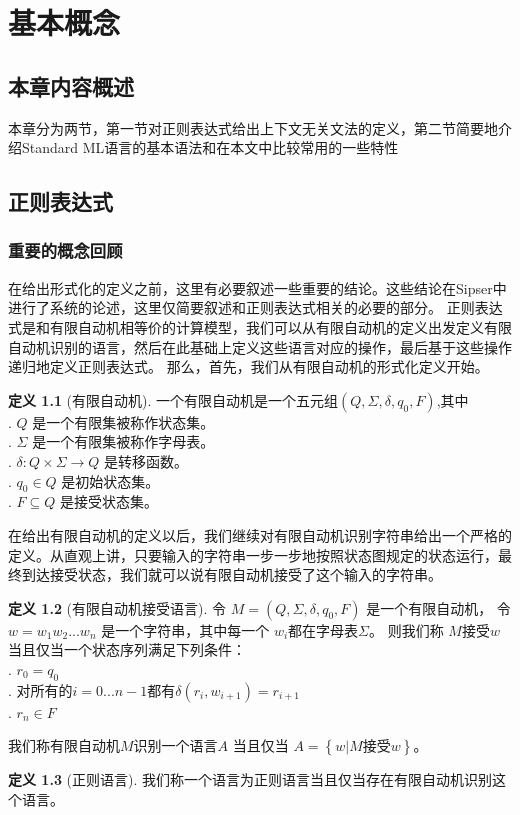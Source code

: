 \documentclass[openany,oneside]{book}
\theoremstyle{definition}
\newtheorem{definition}{\hspace{2em}定义}[chapter]
\begin{document}
\chapter{基本概念}
\section{本章内容概述}
	本章分为两节，第一节对正则表达式给出上下文无关文法的定义，第二节简要地介绍Standard ML语言的基本语法和在本文中比较常用的一些特性

\section{正则表达式}
\subsection{重要的概念回顾}
	在给出形式化的定义之前，这里有必要叙述一些重要的结论。这些结论在Sipser\cite{Sips05a}中进行了系统的论述，这里仅简要叙述和正则表达式相关的必要的部分。
	正则表达式是和有限自动机相等价的计算模型，我们可以从有限自动机的定义出发定义有限自动机识别的语言，然后在此基础上定义这些语言对应的操作，最后基于这些操作递归地定义正则表达式。
	那么，首先，我们从有限自动机的形式化定义开始。
	\begin{definition}[有限自动机]
		一个有限自动机是一个五元组\(\left( Q,\Sigma,\delta,q_0,F\right) \),其中\\
		\indent {}. \(Q\) 是一个有限集被称作状态集。\\
		\indent {}. \(\Sigma\) 是一个有限集被称作字母表。\\
		\indent {}. \(\delta : Q \times \Sigma \rightarrow Q\) 是转移函数。\\
		\indent {}. \(q_0 \in Q\) 是初始状态集。\\
		\indent {}. \(F \subseteq Q\) 是接受状态集。
	\end{definition}
	在给出有限自动机的定义以后，我们继续对有限自动机识别字符串给出一个严格的定义。从直观上讲，只要输入的字符串一步一步地按照状态图规定的状态运行，最终到达接受状态，我们就可以说有限自动机接受了这个输入的字符串。
	\begin{definition}[有限自动机接受语言]
		令 \(M = \left( Q,\Sigma,\delta,q_0,F\right)\) 是一个有限自动机， 令 \( w = w_1 w_2 ... w_n\) 是一个字符串，其中每一个 \(w_i\)都在字母表\(\Sigma\)。 则我们称 \(M\)接受\(w\)当且仅当一个状态序列满足下列条件：\\
		\indent {}. \(r_0 = q_0\)\\
		\indent {}. 对所有的\(i = 0... n -1\)都有\(\delta \left( r_i, w_{i+1}\right) = r_{i+1}\)\\
		\indent {}. \(r_n \in F\)
	\end{definition}
	我们称有限自动机\(M\)识别一个语言\(A\) 当且仅当 \(A = \left\lbrace w | M \mbox{接受} w\right\rbrace \)。\\
	\begin{definition}[正则语言]
		我们称一个语言为正则语言当且仅当存在有限自动机识别这个语言。
	\end{definition}
	
\end{document}
